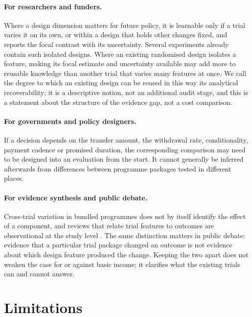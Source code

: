\documentclass[11pt]{article}
\begin{document}
\paragraph{For researchers and funders.} Where a design dimension matters for future policy, it is learnable only if a trial varies it on its own, or within a design that holds other changes fixed, and reports the focal contrast with its uncertainty. Several experiments already contain such isolated designs. Where an existing randomised design isolates a feature, making its focal estimate and uncertainty available may add more to reusable knowledge than another trial that varies many features at once. We call the degree to which an existing design can be reused in this way its analytical recoverability; it is a descriptive notion, not an additional audit stage, and this is a statement about the structure of the evidence gap, not a cost comparison.

\paragraph{For governments and policy designers.} If a decision depends on the transfer amount, the withdrawal rate, conditionality, payment cadence or promised duration, the corresponding comparison may need to be designed into an evaluation from the start. It cannot generally be inferred afterwards from differences between programme packages tested in different places.

\paragraph{For evidence synthesis and public debate.} Cross-trial variation in bundled programmes does not by itself identify the effect of a component, and reviews that relate trial features to outcomes are observational at the study level \citep{thompson2002}. The same distinction matters in public debate: evidence that a particular trial package changed an outcome is not evidence about which design feature produced the change. Keeping the two apart does not weaken the case for or against basic income; it clarifies what the existing trials can and cannot answer.

\section{Limitations}
\end{document}
